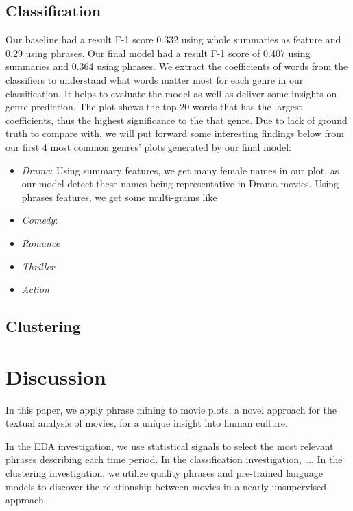 \documentclass{article}
\begin{document}
\begin{multicols}{2}
\subsection{Classification}
Our baseline had a result F-1 score 0.332 using whole summaries as feature and 0.29 using phrases. Our final model had a result F-1 score of 0.407 using summaries and 0.364 using phrases.
We extract the coefficients of words from the classifiers to understand what words matter most for each genre in our classification. It helps to evaluate the model as well as deliver some insights on genre prediction. The plot shows the top 20 words that has the largest coefficients, thus the highest significance to the that genre. Due to lack of ground truth to compare with, we will put forward some interesting findings below from our first 4 most common genres' plots generated by our final model:
\begin{itemize}
    \item  \textit{Drama}: Using summary features, we get many female names in our plot, as our model detect these names being representative in Drama movies. Using phrases features, we get some multi-grams like
    \item \textit{Comedy}:
    \item \textit{Romance}
    \item \textit{Thriller}
    \item \textit{Action}
\end{itemize}



\subsection{Clustering}








\section{Discussion} %
In this paper, we apply phrase mining to movie plots, a novel approach for the textual analysis of movies, for a unique insight into human culture.

In the EDA investigation, we use statistical signals to select the most relevant phrases describing each time period. In the classification investigation, \ldots. In the clustering investigation, we utilize quality phrases and pre-trained language models to discover the relationship between movies in a nearly unsupervised approach.


\end{multicols}
\end{document}
